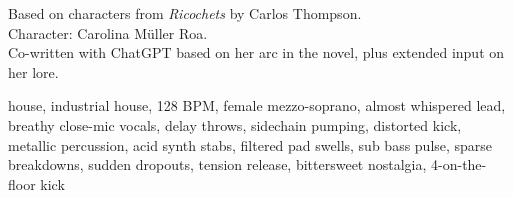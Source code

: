 

\begin{notes}
Based on characters from \emph{Ricochets} by Carlos Thompson.\\
Character: Carolina Müller Roa.\\
Co-written with ChatGPT based on her arc in the novel, plus extended input on her lore.
\end{notes}

\begin{style}
house, industrial house, 128 BPM, female mezzo-soprano, almost whispered lead, breathy close-mic vocals, delay throws, sidechain pumping, distorted kick, metallic percussion, acid synth stabs, filtered pad swells, sub bass pulse, sparse breakdowns, sudden dropouts, tension release, bittersweet nostalgia, 4-on-the-floor kick
\end{style}

